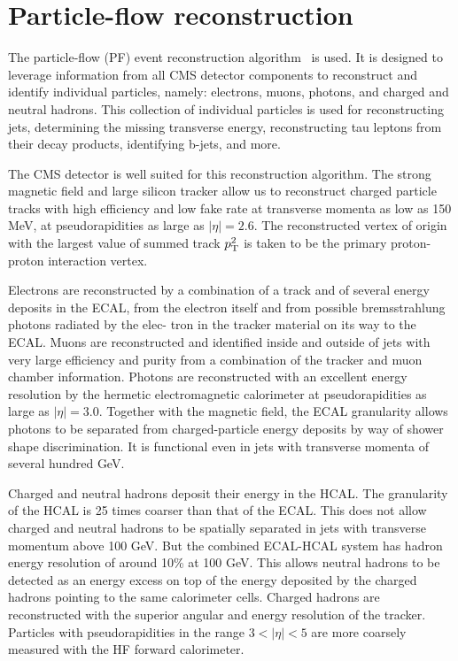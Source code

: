 \section{Particle-flow reconstruction}
\label{sec:pf}

The particle-flow (PF) event reconstruction algorithm~\cite{CMS-PRF-14-001} is used.
It is designed to leverage information from all CMS detector components to reconstruct
and identify individual particles, namely: electrons, muons, photons, and charged and neutral hadrons.
This collection of individual particles is used for reconstructing jets,
determining the missing transverse energy, reconstructing tau leptons from their decay products,
identifying b-jets, and more.

The CMS detector is well suited for this reconstruction algorithm. 
The strong magnetic field and large silicon tracker allow us to reconstruct charged particle tracks
with high efficiency and low fake rate at transverse momenta as low as 150 MeV, at pseudorapidities as large as $|\eta|=2.6$.
The reconstructed vertex of origin with the largest value of summed track $p_{\mathrm{T}}^2$ is taken to be the primary proton-proton interaction vertex.

Electrons are reconstructed by a combination of a track and of several energy deposits in the
ECAL, from the electron itself and from possible bremsstrahlung photons radiated by the elec-
tron in the tracker material on its way to the ECAL.
Muons are reconstructed and identified inside and outside of jets with very large efficiency and
purity from a combination of the tracker and muon chamber information.
Photons are reconstructed with an excellent energy resolution by the hermetic electromagnetic
calorimeter at pseudorapidities as large as $|\eta|=3.0$.
Together with the magnetic field, the ECAL granularity allows photons to be separated from charged-particle energy deposits by way of shower shape discrimination.
It is functional even in jets with transverse momenta of several hundred GeV.

Charged and neutral hadrons deposit their energy in the HCAL.
The granularity of the HCAL is 25 times coarser than that of the ECAL.
This does not allow charged and neutral hadrons to be spatially separated in
jets with transverse momentum above 100 GeV.
But the combined ECAL-HCAL system has hadron energy resolution of around 10\% at 100 GeV.
This allows neutral hadrons to be detected as an energy excess on top of the energy deposited
by the charged hadrons pointing to the same calorimeter cells. 
Charged hadrons are reconstructed with the superior angular and energy resolution of the tracker.
Particles with pseudorapidities in the range $3<|\eta|<5$ are more coarsely measured with the HF forward calorimeter.

